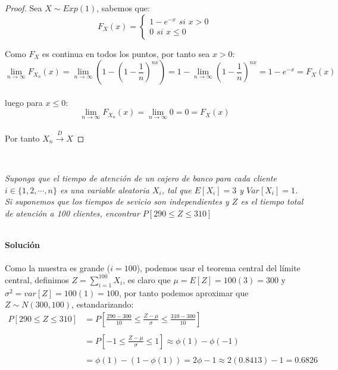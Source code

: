 \documentclass[11pt]{article}
\begin{document}
\begin{proof}
    Sea $X\sim Exp(1)$, sabemos que:\,\\
    \[
    F_{X}(x)=\begin{cases}
        1-e^{-x}\,\,si\,\,x>0\\
        0\,\,si\,\,x\leq 0 
    \end{cases}
    \]

Como $F_X$ es continua en todos los puntos, por tanto sea $x>0$:\,\\
\begin{equation*}
    \lim_{n\rightarrow \infty}F_{X_n}(x)=\lim_{n\rightarrow \infty}\left(1-\left(1-\frac{1}{n}\right)^{nx}\right)=1-\lim_{n\rightarrow \infty}\left(1-\frac{1}{n}\right)^{nx}=1-e^{-x}=F_X(x)
\end{equation*}\,\\
luego para $x\leq 0$:\,\\
\begin{equation*}
    \lim_{n\rightarrow \infty}F_{X_n}(x)=\lim_{n\rightarrow \infty}0=0=F_X(x)
\end{equation*}\,\\
Por tanto $X_{n}\xrightarrow{D} X$
\end{proof}\,\\
\begin{tcolorbox}[
	title = \textcolor{black}{\textcolor{white}{Problema 4}},]
\textit{Suponga que el tiempo de atenci\'on de un cajero de banco para cada cliente $i\in \{1,2,\cdots,n\}$ es una variable aleatoria 
$X_i$, tal que $E[X_i]=3$ y $Var[X_i]=1$. Si suponemos que los tiempos de sevicio son independientes y $Z$ es el tiempo total de atenci\'on a 100 clientes,
encontrar $P[290\leq Z\leq 310]$
}
\end{tcolorbox}
\,\\
\textbf{Soluci\'on}\\
\\
Como la muestra es grande ($i=100$), podemos usar el teorema central del l\'imite central, definimos $Z=\displaystyle\sum_{i=1}^{100}X_i$, es claro que $\mu=E[Z]=100(3)=300$ y $\sigma^2=var[Z]=100(1)=100$, por tanto podemos aproximar que $Z\sim N(300,100)$, estandarizando:\,\\
\begin{align*}
    P[290\leq Z\leq 310]&=P\left[\frac{290-300}{10}\leq \frac{Z-\mu}{\sigma}\leq \frac{310-300}{10}\right]\\
    \,\\
    &=P\left[-1\leq \frac{Z-\mu}{\sigma}\leq 1\right]\approx\phi(1)-\phi(-1)\,\\
    \\
    &=\phi(1)-(1-\phi(1))=2\phi-1\approx  2(0.8413)-1=0.6826
\end{align*}
\end{document}
